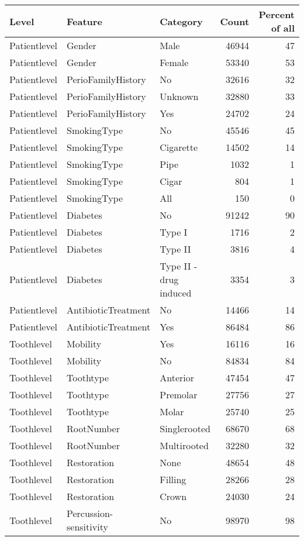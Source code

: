 \begin{tabular}{lllrr}
\toprule
Level & Feature & Category & Count & Percent of all \\
\midrule
Patientlevel & Gender & Male & 46944 & 47 \\
Patientlevel & Gender & Female & 53340 & 53 \\
Patientlevel & PerioFamilyHistory & No & 32616 & 32 \\
Patientlevel & PerioFamilyHistory & Unknown & 32880 & 33 \\
Patientlevel & PerioFamilyHistory & Yes & 24702 & 24 \\
Patientlevel & SmokingType & No & 45546 & 45 \\
Patientlevel & SmokingType & Cigarette & 14502 & 14 \\
Patientlevel & SmokingType & Pipe & 1032 & 1 \\
Patientlevel & SmokingType & Cigar & 804 & 1 \\
Patientlevel & SmokingType & All & 150 & 0 \\
Patientlevel & Diabetes & No & 91242 & 90 \\
Patientlevel & Diabetes & Type I & 1716 & 2 \\
Patientlevel & Diabetes & Type II & 3816 & 4 \\
Patientlevel & Diabetes & Type II - drug induced & 3354 & 3 \\
Patientlevel & AntibioticTreatment & No & 14466 & 14 \\
Patientlevel & AntibioticTreatment & Yes & 86484 & 86 \\
Toothlevel & Mobility & Yes & 16116 & 16 \\
Toothlevel & Mobility & No & 84834 & 84 \\
Toothlevel & Toothtype & Anterior & 47454 & 47 \\
Toothlevel & Toothtype & Premolar & 27756 & 27 \\
Toothlevel & Toothtype & Molar & 25740 & 25 \\
Toothlevel & RootNumber & Singlerooted & 68670 & 68 \\
Toothlevel & RootNumber & Multirooted & 32280 & 32 \\
Toothlevel & Restoration & None & 48654 & 48 \\
Toothlevel & Restoration & Filling & 28266 & 28 \\
Toothlevel & Restoration & Crown & 24030 & 24 \\
Toothlevel & Percussion-sensitivity & No & 98970 & 98 \\

\end{tabular}
